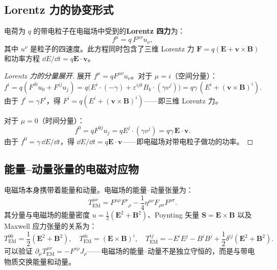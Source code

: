 \subsection{Lorentz 力的协变形式}

\begin{theorem}
电荷为 $q$ 的带电粒子在电磁场中受到的\textbf{Lorentz 四力}为：
\begin{equation}\label{eq:lorentz_force}
    \boxed{f^\mu = q\,F^{\mu\nu} u_\nu},
\end{equation}
其中 $u^\nu$ 是粒子的四速度。此方程同时包含了三维 Lorentz 力 $\mathbf{F} = q(\mathbf{E} + \mathbf{v}\times\mathbf{B})$ 和功率方程 $\dd E/\dd t = q\mathbf{E}\cdot\mathbf{v}$。
\end{theorem}

\begin{proof}[Lorentz 力的分量展开]
展开 $f^\mu = q F^{\mu\nu}u_\nu$。对于 $\mu = i$（空间分量）：
\[
f^i = q(F^{i0}u_0 + F^{ij}u_j) = q\bigl(E^i \cdot (-\gamma) + \varepsilon^{ijk}B_k \cdot (\gamma v^j)\bigr)
= q\gamma\,(E^i + (\mathbf{v}\times\mathbf{B})^i).
\]
由于 $f^i = \gamma F^i$，得 $F^i = q(E^i + (\mathbf{v}\times\mathbf{B})^i)$——即三维 Lorentz 力。

对于 $\mu = 0$（时间分量）：
\[
f^0 = q F^{0j}u_j = q E^j \cdot (\gamma v^j) = q\gamma\,\mathbf{E}\cdot\mathbf{v}.
\]
由于 $f^0 = \gamma\,\dd E/\dd t$，得 $\dd E/\dd t = q\mathbf{E}\cdot\mathbf{v}$——即电磁场对带电粒子做功的功率。
\end{proof}

\subsection{能量--动量张量的电磁对应物}

电磁场本身携带着能量和动量。电磁场的能量--动量张量为：
\begin{equation}\label{eq:em_stress_energy}
    T^{\mu\nu}_{\text{EM}} = F^{\mu\rho} F^\nu{}_\rho - \frac{1}{4}\eta^{\mu\nu} F_{\rho\sigma}F^{\rho\sigma}.
\end{equation}
其分量与电磁场的能量密度 $u = \frac{1}{2}(\mathbf{E}^2 + \mathbf{B}^2)$、Poynting 矢量 $\mathbf{S} = \mathbf{E}\times\mathbf{B}$ 以及 Maxwell 应力张量的关系为：
\begin{equation}
    T^{00}_{\text{EM}} = \frac{1}{2}(\mathbf{E}^2 + \mathbf{B}^2), \quad
    T^{0i}_{\text{EM}} = (\mathbf{E}\times\mathbf{B})^i, \quad
    T^{ij}_{\text{EM}} = -E^i E^j - B^i B^j + \frac{1}{2}\delta^{ij}(\mathbf{E}^2 + \mathbf{B}^2).
\end{equation}
可以验证 $\partial_\mu T^{\mu\nu}_{\text{EM}} = -F^{\nu\rho}J_\rho$——电磁场的能量--动量不是独立守恒的，而是与带电物质交换能量和动量。

